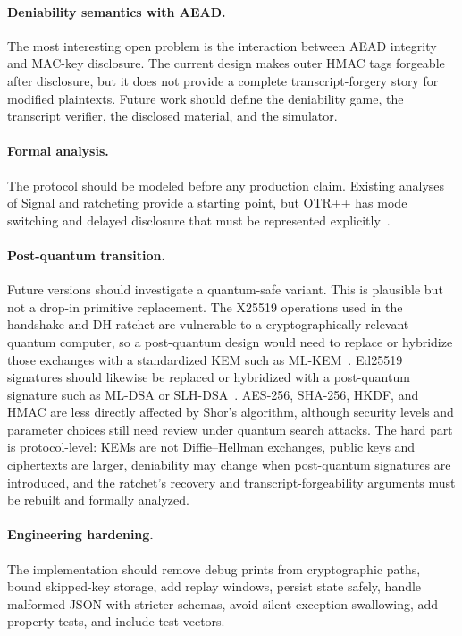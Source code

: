 \documentclass[11pt]{article}
\newcommand{\prot}{OTR++}
\begin{document}
\paragraph{Deniability semantics with AEAD.}
The most interesting open problem is the interaction between AEAD integrity and MAC-key disclosure. The current design makes outer HMAC tags forgeable after disclosure, but it does not provide a complete transcript-forgery story for modified plaintexts. Future work should define the deniability game, the transcript verifier, the disclosed material, and the simulator.

\paragraph{Formal analysis.}
The protocol should be modeled before any production claim. Existing analyses of Signal and ratcheting provide a starting point, but \prot{} has mode switching and delayed disclosure that must be represented explicitly~\cite{cohngordon2020signal,alwen2019doubleratchet}.

\paragraph{Post-quantum transition.}
Future versions should investigate a quantum-safe variant. This is plausible but not a drop-in primitive replacement. The X25519 operations used in the handshake and DH ratchet are vulnerable to a cryptographically relevant quantum computer, so a post-quantum design would need to replace or hybridize those exchanges with a standardized KEM such as ML-KEM~\cite{nist_fips203}. Ed25519 signatures should likewise be replaced or hybridized with a post-quantum signature such as ML-DSA or SLH-DSA~\cite{nist_fips204,nist_fips205}. AES-256, SHA-256, HKDF, and HMAC are less directly affected by Shor's algorithm, although security levels and parameter choices still need review under quantum search attacks. The hard part is protocol-level: KEMs are not Diffie--Hellman exchanges, public keys and ciphertexts are larger, deniability may change when post-quantum signatures are introduced, and the ratchet's recovery and transcript-forgeability arguments must be rebuilt and formally analyzed.

\paragraph{Engineering hardening.}
The implementation should remove debug prints from cryptographic paths, bound skipped-key storage, add replay windows, persist state safely, handle malformed JSON with stricter schemas, avoid silent exception swallowing, add property tests, and include test vectors.
\end{document}
